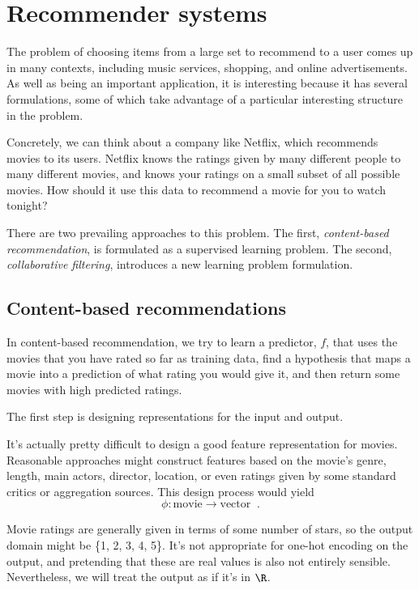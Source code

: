 \chapter{Recommender systems}
The problem of choosing items from a large set to recommend to a user
comes up in many contexts, including  music services, shopping, and online
advertisements.  As well as being an important application, it is
interesting because it has several formulations, some of which take
advantage of a particular interesting structure in the problem.  

Concretely, we can think about a company like Netflix, which
recommends movies to its users.  Netflix knows the ratings given by
many different people to many different movies, and knows your ratings on a
small subset of all possible movies. How should it use this data to 
recommend a movie for you to watch tonight?

There are two prevailing approaches to this problem.  The first,
{\em content-based recommendation}, is formulated as a supervised learning
problem.  The second, {\em collaborative filtering}, introduces a new
learning problem formulation.

\section{Content-based recommendations}
In content-based recommendation, we try to learn a predictor, $f$,
that uses the movies that you have rated so far as training data,
find a hypothesis that maps a movie into a prediction of what rating
you would give it, and then return some movies with high predicted
ratings.  

The first step is designing representations for the input and output.

It's actually pretty difficult to design a good feature representation
for movies.   Reasonable approaches might construct features based on
the movie's genre, length,  main actors, director, location, or even
ratings given by some standard critics or aggregation sources.  This
design process would yield
    \[\phi : \text{movie} \rightarrow \text{vector}\;\;.\]

Movie ratings are generally given in terms of some number of stars, 
so the output domain might be \{1, 2, 3, 4, 5\}.  It's not
appropriate for one-hot encoding on the output, and pretending that
these are real values is also not entirely sensible.  Nevertheless, we
will treat the output as if it's in $\R$.

